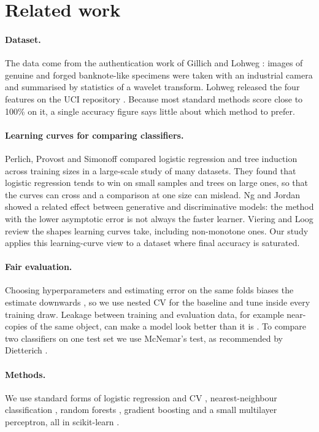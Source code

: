 \section{Related work}
\label{sec:related}
\paragraph{Dataset.} The data come from the authentication work of Gillich and Lohweg \cite{gillich2010banknote}: images of genuine and forged banknote-like specimens were taken with an industrial camera and summarised by statistics of a wavelet transform. Lohweg released the four features on the UCI repository \cite{lohweg2012uci}. Because most standard methods score close to 100\% on it, a single accuracy figure says little about which method to prefer.

\paragraph{Learning curves for comparing classifiers.} Perlich, Provost and Simonoff \cite{perlich2003tree} compared logistic regression and tree induction across training sizes in a large-scale study of many datasets. They found that logistic regression tends to win on small samples and trees on large ones, so that the curves can cross and a comparison at one size can mislead. Ng and Jordan \cite{ng2002discriminative} showed a related effect between generative and discriminative models: the method with the lower asymptotic error is not always the faster learner. Viering and Loog \cite{viering2023shape} review the shapes learning curves take, including non-monotone ones. Our study applies this learning-curve view to a dataset where final accuracy is saturated.

\paragraph{Fair evaluation.} Choosing hyperparameters and estimating error on the same folds biases the estimate downwards \cite{varma2006bias,cawley2010overfitting}, so we use nested CV for the baseline and tune inside every training draw. Leakage between training and evaluation data, for example near-copies of the same object, can make a model look better than it is \cite{kaufman2012leakage}. To compare two classifiers on one test set we use McNemar's test, as recommended by Dietterich \cite{dietterich1998approximate}.

\paragraph{Methods.} We use standard forms of logistic regression and CV \cite{james2021isl}, nearest-neighbour classification \cite{cover1967nearest}, random forests \cite{breiman2001random}, gradient boosting \cite{friedman2001greedy} and a small multilayer perceptron, all in scikit-learn \cite{pedregosa2011scikit}.

